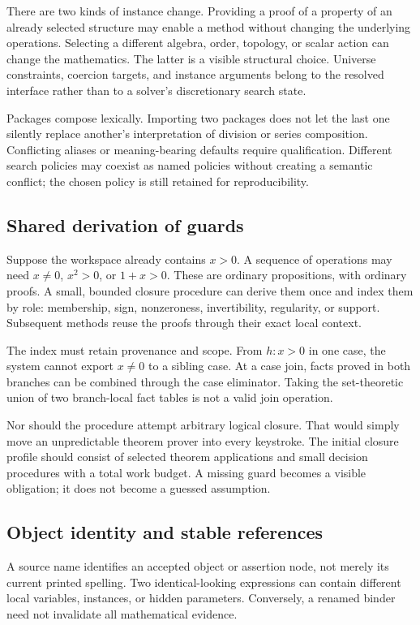 \documentclass[11pt,letterpaper]{article}
\theoremstyle{definition}
\theoremstyle{remark}
\begin{document}
There are two kinds of instance change. Providing a proof of a property of an
already selected structure may enable a method without changing the underlying
operations. Selecting a different algebra, order, topology, or scalar action
can change the mathematics. The latter is a visible structural choice. Universe
constraints, coercion targets, and instance arguments belong to the resolved
interface rather than to a solver's discretionary search state.

Packages compose lexically. Importing two packages does not let the last one
silently replace another's interpretation of division or series composition.
Conflicting aliases or meaning-bearing defaults require qualification. Different
search policies may coexist as named policies without creating a semantic
conflict; the chosen policy is still retained for reproducibility.

\subsection{Shared derivation of guards}
Suppose the workspace already contains $x>0$. A sequence of operations may need
$x\neq0$, $x^2>0$, or $1+x>0$. These are ordinary propositions, with ordinary
proofs. A small, bounded closure procedure can derive them once and index them
by role: membership, sign, nonzeroness, invertibility, regularity, or support.
Subsequent methods reuse the proofs through their exact local context.

The index must retain provenance and scope. From $h:x>0$ in one case, the system
cannot export $x\neq0$ to a sibling case. At a case join, facts proved in both
branches can be combined through the case eliminator. Taking the set-theoretic
union of two branch-local fact tables is not a valid join operation.

Nor should the procedure attempt arbitrary logical closure. That would simply
move an unpredictable theorem prover into every keystroke. The initial closure
profile should consist of selected theorem applications and small decision
procedures with a total work budget. A missing guard becomes a visible
obligation; it does not become a guessed assumption.

\subsection{Object identity and stable references}
A source name identifies an accepted object or assertion node, not merely its
current printed spelling. Two identical-looking expressions can contain
different local variables, instances, or hidden parameters. Conversely, a
renamed binder need not invalidate all mathematical evidence.
\end{document}
